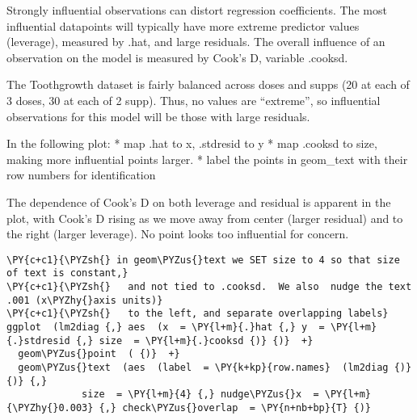 Strongly influential observations can distort regression coefficients.
The most influential datapoints will typically have more extreme
predictor values (leverage), measured by .hat, and large residuals. The
overall influence of an observation on the model is measured by Cook's
D, variable .cooksd.

The Toothgrowth dataset is fairly balanced across doses and supps (20 at
each of 3 doses, 30 at each of 2 supp). Thus, no values are ``extreme'',
so influential observations for this model will be those with large
residuals.

In the following plot: * map .hat to x, .stdresid to y * map .cooksd to
size, making more influential points larger. * label the points in
geom\_text with their row numbers for identification

The dependence of Cook's D on both leverage and residual is apparent in
the plot, with Cook's D rising as we move away from center (larger
residual) and to the right (larger leverage). No point looks too
influential for concern.

    \begin{tcolorbox}[breakable, size=fbox, boxrule=1pt, pad at break*=1mm,colback=cellbackground, colframe=cellborder]
\begin{Verbatim}[commandchars=\\\{\}]
\PY{c+c1}{\PYZsh{} in geom\PYZus{}text we SET size to 4 so that size of text is constant,}
\PY{c+c1}{\PYZsh{}   and not tied to .cooksd.  We also  nudge the text .001 (x\PYZhy{}axis units)}
\PY{c+c1}{\PYZsh{}   to the left, and separate overlapping labels}
ggplot  (lm2diag {,} aes  (x  = \PY{l+m}{.}hat {,} y  = \PY{l+m}{.}stdresid {,} size  = \PY{l+m}{.}cooksd {)} {)}  +}     
  geom\PYZus{}point  ( {)}  +}
  geom\PYZus{}text  (aes  (label  = \PY{k+kp}{row.names}  (lm2diag {)} {)} {,} 
             size  = \PY{l+m}{4} {,} nudge\PYZus{}x  = \PY{l+m}{\PYZhy{}0.003} {,} check\PYZus{}overlap  = \PY{n+nb+bp}{T} {)}
\end{Verbatim}
\end{tcolorbox}

    
    
    \begin{center}
    \end{center}
    { \hspace*{\fill} \\}
    
    \begin{tcolorbox}[breakable, size=fbox, boxrule=1pt, pad at break*=1mm,colback=cellbackground, colframe=cellborder]
\begin{Verbatim}[commandchars=\\\{\}]

\end{Verbatim}
\end{tcolorbox}


    
    
    
    
